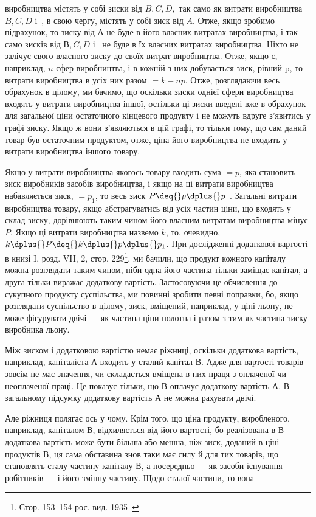 \parcont{}  %
виробництва містять у собі зиски від $B, C, D,$ так само як витрати виробництва $B, C, D$ і~, в
свою чергу, містять у собі
зиск від $A$. Отже, якщо зробимо підрахунок, то зиску від $А$ не
буде в його власних витратах виробництва, і так само зисків
від $В, C, D$ і~ не буде в їх власних витратах виробництва.
Ніхто не залічує свого власного зиску до своїх витрат виробництва. Отже, якщо є, наприклад, $n$ сфер
виробництва, і в кожній з них добувається зиск, рівний p, то витрати виробництва в усіх них разом
$= k - np$. Отже, розглядаючи весь обрахунок
в цілому, ми бачимо, що оскільки зиски однієї сфери виробництва входять у витрати виробництва іншої,
остільки ці зиски
введені вже в обрахунок для загальної ціни остаточного кінцевого
продукту і не можуть вдруге з’явитись у графі зиску. Якщо ж
вони з’являються в цій графі, то тільки тому, що сам даний
товар був остаточним продуктом, отже, ціна його виробництва
не входить у витрати виробництва іншого товару.

Якщо у витрати виробництва якогось товару входить сума $= p$, яка становить зиск виробників засобів
виробництва, і якщо
на ці витрати виробництва набавляється зиск, $= p_1$, то весь зиск
$P \deq{} p \dplus{} p_1$. Загальні витрати виробництва товару, якщо абстрагуватись від усіх частин ціни, що
входять у склад зиску, дорівнюють таким чином його власним витратам виробництва мінус $P$.
Якщо ці витрати виробництва назвемо $k$, то, очевидно, $k \dplus{} P \deq{} k \dplus{} p \dplus{} p_1$. При дослідженні додаткової
вартості в книзі I,
розд. VII, 2, стор. 229\footnote*{Стор. 153--154 рос. вид. 1935~ }, ми бачили, що продукт кожного капіталу можна розглядати таким чином, ніби
одна його частина
тільки заміщає капітал, а друга тільки виражає додаткову вартість. Застосовуючи це обчислення до
сукупного продукту
суспільства, ми повинні зробити певні поправки, бо, якщо
розглядати суспільство в цілому, зиск, вміщений, наприклад,
у ціні льону, не може фігурувати двічі — як частина ціни полотна
і разом з тим як частина зиску виробника льону.

Між зиском і додатковою вартістю немає ріжниці, оскільки
додаткова вартість, наприклад, капіталіста $А$ входить у сталий
капітал $В$. Адже для вартості товарів зовсім не має значення, чи
складається вміщена в них праця з оплаченої чи неоплаченої праці.
Це показує тільки, що $В$ оплачує додаткову вартість $А$. В загальному підсумку додаткову вартість $А$ не
можна рахувати двічі.

Але ріжниця полягає ось у чому. Крім того, що ціна продукту,
виробленого, наприклад, капіталом $В$, відхиляється від його вартості, бо реалізована в $В$ додаткова
вартість може бути більша
або менша, ніж зиск, доданий в ціні продуктів $В$, ця сама обставина
знов таки має силу й для тих товарів, що становлять сталу
частину капіталу $В$, а посередньо — як засоби існування робітників — і його змінну частину. Щодо
сталої частини, то вона
\parbreak{}  %
